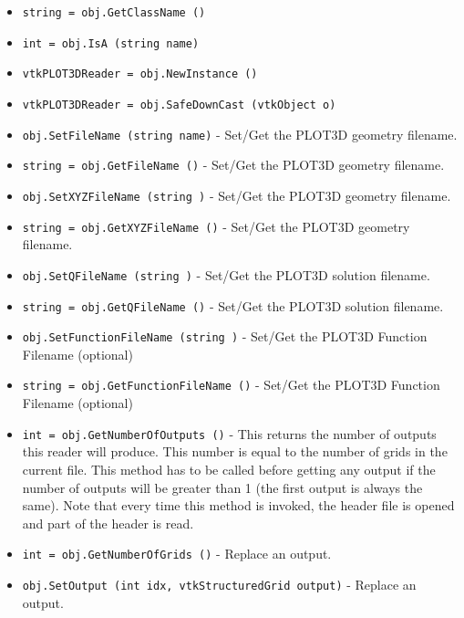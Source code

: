 \begin{itemize}
\item  \verb|string = obj.GetClassName ()|

\item  \verb|int = obj.IsA (string name)|

\item  \verb|vtkPLOT3DReader = obj.NewInstance ()|

\item  \verb|vtkPLOT3DReader = obj.SafeDownCast (vtkObject o)|

\item  \verb|obj.SetFileName (string name)| -  Set/Get the PLOT3D geometry filename.

\item  \verb|string = obj.GetFileName ()| -  Set/Get the PLOT3D geometry filename.

\item  \verb|obj.SetXYZFileName (string )| -  Set/Get the PLOT3D geometry filename.

\item  \verb|string = obj.GetXYZFileName ()| -  Set/Get the PLOT3D geometry filename.

\item  \verb|obj.SetQFileName (string )| -  Set/Get the PLOT3D solution filename.

\item  \verb|string = obj.GetQFileName ()| -  Set/Get the PLOT3D solution filename.

\item  \verb|obj.SetFunctionFileName (string )| -  Set/Get the PLOT3D Function Filename (optional)

\item  \verb|string = obj.GetFunctionFileName ()| -  Set/Get the PLOT3D Function Filename (optional)

\item  \verb|int = obj.GetNumberOfOutputs ()| -  This returns the number of outputs this reader will produce.
 This number is equal to the number of grids in the current 
 file. This method has to be called before getting any output
 if the number of outputs will be greater than 1 (the first
 output is always the same). Note that every time this method
 is invoked, the header file is opened and part of the header 
 is read.

\item  \verb|int = obj.GetNumberOfGrids ()| -  Replace an output.

\item  \verb|obj.SetOutput (int idx, vtkStructuredGrid output)| -  Replace an output.


\end{itemize}
